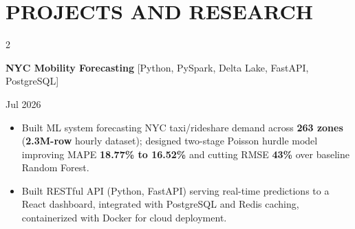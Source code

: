 \documentclass[10pt, letterpaper]{article}
\newenvironment{highlights}{
    \begin{itemize}[
        topsep=0.10 cm,
        parsep=0.06 cm,
        partopsep=0pt,
        itemsep=0.06 cm,
        leftmargin=12pt
    ]
}{
    \end{itemize}
}
\newenvironment{twocolentry}[2][]{
    \onecolentry
    \def\secondColumn{#2}
    \setcolumnwidth{\fill, 4.5 cm}
    \begin{paracol}{2}
}{
    \switchcolumn \raggedleft \secondColumn
    \end{paracol}
    \endonecolentry
}
\begin{document}
\section{PROJECTS AND RESEARCH}
\begin{twocolentry}{Jul 2026}
\textbf{NYC Mobility Forecasting} [Python, PySpark, Delta Lake, FastAPI, PostgreSQL]
\end{twocolentry}
\begin{highlights}
  \item Built ML system forecasting NYC taxi/rideshare demand across \textbf{263 zones} (\textbf{2.3M-row} hourly dataset); designed two-stage Poisson hurdle model improving MAPE \textbf{18.77\% to 16.52\%} and cutting RMSE \textbf{43\%} over baseline Random Forest.
  \item Built RESTful API (Python, FastAPI) serving real-time predictions to a React dashboard, integrated with PostgreSQL and Redis caching, containerized with Docker for cloud deployment.
\end{highlights}
\end{document}
